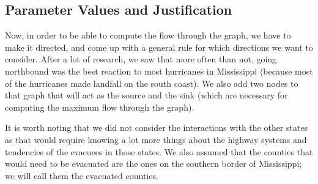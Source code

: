 \documentclass[titlepage]{article}
\begin{document}
  \subsection{Parameter Values and Justification}
    \par Now, in order to be able to compute the flow through the graph, we have to make it directed, and come up with a general rule for which directions we want to consider. After a lot of research, we saw that more often than not, going northbound was the best reaction to most hurricanes in Mississippi (because most of the hurricanes made landfall on the south coast). 
    We also add two nodes to that graph that will act as the source and the sink (which are necessary for computing the maximum flow through the graph).
    \par It is worth noting that we did not consider the interactions with the other states as that would require knowing a lot more things about the highway systems and tendencies of the evacuees in those states. We also assumed that the counties that would need to be evacuated are the ones on the southern border of Mississippi; we will call them the evacuated counties.
\end{document}

